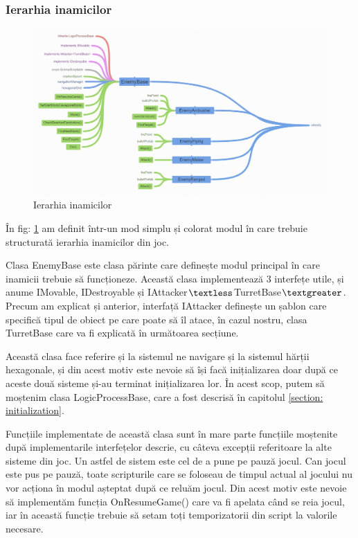 \documentclass[12pt, a4paper]{article}
\begin{document}
	
	
	
	
	\subsubsection{Ierarhia inamicilor}
	
	\begin{figure}[H]
		\centering
		\includegraphics[width=1\textwidth]{EnemyHierarchy.png}
		\caption{Ierarhia inamicilor}
		\label{fig: enemyHierarchy}
	\end{figure}

	În fig: \ref{fig: enemyHierarchy} am definit într-un mod simplu și colorat modul în care trebuie structurată ierarhia inamicilor din joc.
	\newline
	
	Clasa EnemyBase este clasa părinte care definește modul principal în care inamicii trebuie să funcționeze. Această clasa implementează 3 interfețe utile, și anume IMovable, IDestroyable și IAttacker$\textless$TurretBase$\textgreater$. Precum am explicat și anterior, interfață IAttacker definește un șablon care specifică tipul de obiect pe care poate să îl atace, în cazul nostru, clasa TurretBase care va fi explicată în următoarea secțiune.
	\newline
	
	Această clasa face referire și la sistemul ne navigare și la sistemul hărții hexagonale, și din acest motiv este nevoie să își facă inițializarea doar după ce aceste două sisteme și-au terminat inițializarea lor. În acest scop, putem să moștenim clasa LogicProcessBase, care a fost descrisă în capitolul \ref{section: initialization}.
	\newline
	
	Funcțiile implementate de această clasa sunt în mare parte funcțiile moștenite după implementarile interfețelor descrie, cu câteva excepții referitoare la alte sisteme din joc. Un astfel de sistem este cel de a pune pe pauză jocul. Can jocul este pus pe pauză, toate scripturile care se foloseau de timpul actual al jocului nu vor acționa în modul așteptat după ce reluăm jocul. Din acest motiv este nevoie să implementăm funcția OnResumeGame() care va fi apelata când se reia jocul, iar în această funcție trebuie să setam toți temporizatorii din script la valorile necesare.
	\newline
	
\end{document}
